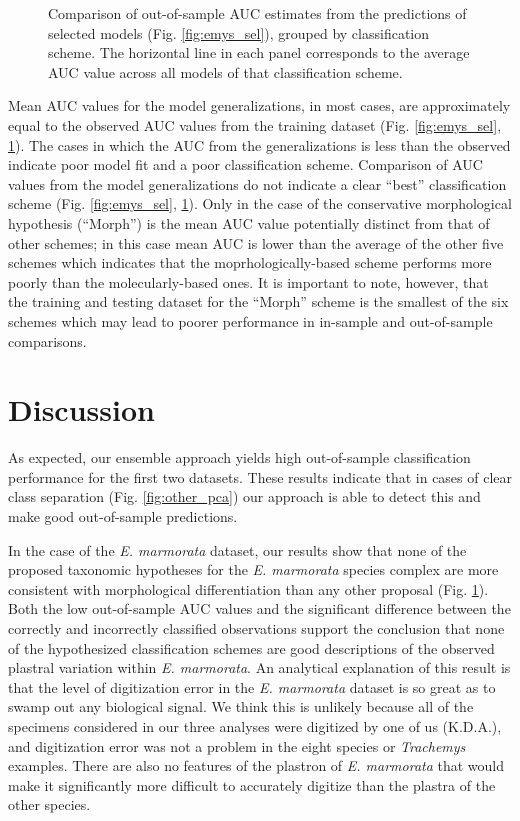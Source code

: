 \documentclass[10pt,letterpaper]{article}
\begin{document}
\begin{figure}[ht]
  \centering
  \caption{Comparison of out-of-sample AUC estimates from the predictions of selected models (Fig. \ref{fig:emys_sel}), grouped by classification scheme. The horizontal line in each panel corresponds to the average AUC value across all models of that classification scheme.}
  \label{fig:emys_oos}
\end{figure}


Mean AUC values for the model generalizations, in most cases, are approximately equal to the observed AUC values from the training dataset (Fig. \ref{fig:emys_sel}, \ref{fig:emys_oos}). The  cases in which the AUC from the  generalizations is less than the observed indicate poor model fit and a poor classification scheme. Comparison of AUC values from the model generalizations do not indicate a clear ``best'' classification scheme (Fig. \ref{fig:emys_sel}, \ref{fig:emys_oos}). Only in the case of the conservative morphological hypothesis (``Morph'') is the mean AUC value potentially distinct from that of other schemes; in this case mean AUC is lower than the average of the other five schemes which indicates that the moprhologically-based scheme performs more poorly than the molecularly-based ones. It is important to note, however, that the training and testing dataset for the ``Morph'' scheme is the smallest of the six schemes which may lead to poorer performance in in-sample and out-of-sample comparisons.





\section*{Discussion}


As expected, our ensemble approach yields high out-of-sample classification performance for the first two datasets. These results indicate that in cases of clear class separation (Fig. \ref{fig:other_pca}) our approach is able to detect this and make good out-of-sample predictions.

In the case of the \textit{E. marmorata} dataset, our results show that none of the proposed taxonomic hypotheses for the \textit{E. marmorata} species complex are more consistent with morphological differentiation than any other proposal (Fig. \ref{fig:emys_oos}). Both the low out-of-sample AUC values and the significant difference between the correctly and incorrectly classified observations support the conclusion that none of the hypothesized classification schemes are good descriptions of the observed plastral variation within \textit{E. marmorata}. An analytical explanation of this result is that the level of digitization error in the \textit{E. marmorata} dataset is so great as to swamp out any biological signal. We think this is unlikely because all of the specimens considered in our three analyses were digitized by one of us (K.D.A.), and digitization error was not a problem in the eight species or \textit{Trachemys} examples. There are also no features of the plastron of \textit{E. marmorata} that would make it significantly more difficult to accurately digitize than the plastra of the other species.
\end{document}
